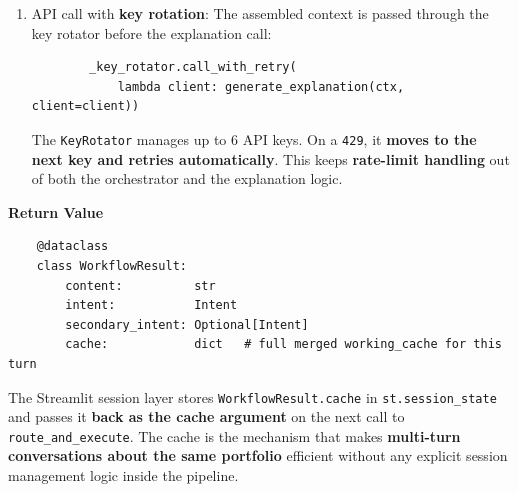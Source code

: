 \begin{enumerate}
    \begin{itemize}
        \item \texttt{clean\_metrics} omits the nested \texttt{risk\_contribution} dict; that structure is passed separately.
        \item \texttt{requested\_metrics} is preserved so the response can stay focused on the metrics the user explicitly asked for.
        \item If the portfolio changed and \texttt{old\_cache} exists, prior-turn metrics, risk contributions, and risk classification are stored under \texttt{previous\_*} keys.
        \item Those \texttt{previous\_*} fields enable \textbf{before/after comparison mode}, so the LLM can compare the old and new portfolios instead of producing a standalone reading.
        \item Dual-intent queries populate the secondary fields, allowing both requests to be answered in one response.
        \item \texttt{chat\_history} keeps only the \textbf{last 6 messages}, with each message truncated to 300 characters.
    \end{itemize}

    \item API call with \textbf{key rotation}:
    The assembled context is passed through the key rotator before the explanation call:
    \begin{lstlisting}
        _key_rotator.call_with_retry(
            lambda client: generate_explanation(ctx, client=client))
    \end{lstlisting}

    The \texttt{KeyRotator} manages up to 6 API keys. On a \texttt{429}, it \textbf{moves to the next key and retries automatically}. This keeps \textbf{rate-limit handling} out of both the orchestrator and the explanation logic.

\end{enumerate}


\textbf{Return Value}
\begin{lstlisting}
    @dataclass
    class WorkflowResult:
        content:          str
        intent:           Intent
        secondary_intent: Optional[Intent]
        cache:            dict   # full merged working_cache for this turn
\end{lstlisting}

The Streamlit session layer stores \texttt{WorkflowResult.cache} in \texttt{st.session\_state} and passes it \textbf{back as the cache argument} on the next call to \texttt{route\_and\_execute}. The cache is the mechanism that makes \textbf{multi-turn conversations about the same portfolio} efficient without any explicit session management logic inside the pipeline.\\


